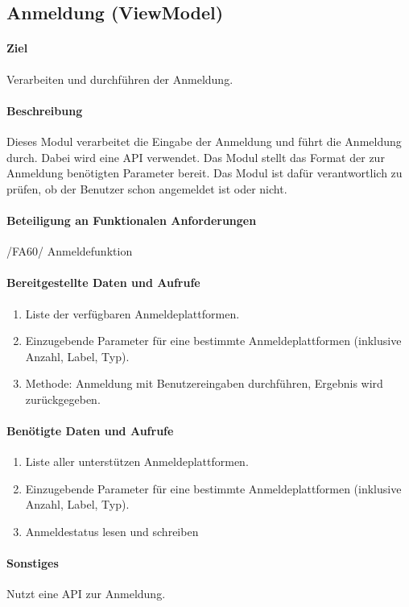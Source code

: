 \subsection{Anmeldung (ViewModel)}
\paragraph{Ziel}
Verarbeiten und durchführen der Anmeldung.
\paragraph{Beschreibung}
Dieses Modul verarbeitet die Eingabe der Anmeldung und führt die Anmeldung durch. Dabei wird eine API verwendet.
Das Modul stellt das Format der zur Anmeldung benötigten Parameter bereit.
Das Modul ist dafür verantwortlich zu prüfen, ob der Benutzer schon angemeldet ist oder nicht.
\paragraph{Beteiligung an Funktionalen Anforderungen}
/FA60/ Anmeldefunktion
\paragraph{Bereitgestellte Daten und Aufrufe}
\begin{enumerate}
    \item Liste der verfügbaren Anmeldeplattformen.
    \item Einzugebende Parameter für eine bestimmte Anmeldeplattformen (inklusive Anzahl, Label, Typ).
    \item Methode: Anmeldung mit Benutzereingaben durchführen, Ergebnis wird zurückgegeben.
\end{enumerate}
\paragraph{Benötigte Daten und Aufrufe}
\begin{enumerate}
    \item Liste aller unterstützen Anmeldeplattformen.
    \item Einzugebende Parameter für eine bestimmte Anmeldeplattformen (inklusive Anzahl, Label, Typ).
    \item Anmeldestatus lesen und schreiben
\end{enumerate}
\paragraph{Sonstiges}
Nutzt eine API zur Anmeldung.